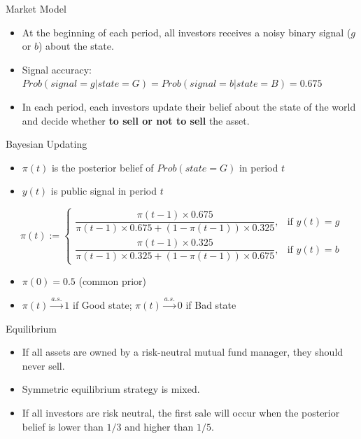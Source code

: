 \documentclass{beamer}
\begin{document}
\begin{frame}{Market Model}
\begin{itemize}

    \item At the beginning of each period, all investors receives a noisy binary signal ($g$ or $b$) about the state.
    \item Signal accuracy: \\$Prob( signal = g|state = G ) =  Prob( signal = b|state = B ) = 0.675$
    \item In each period, each investors update their belief about the state of the world and decide whether \textbf{to sell or not to sell} the asset.
\end{itemize}
\end{frame}


\begin{frame}{Bayesian Updating}
\begin{itemize}
    \item $\pi(t)$ is the posterior belief of $Prob(state = G)$ in period $t$  
    \item $y(t)$ is public signal in period $t$  
\end{itemize}

\begin{equation*}
    \pi(t) :=
    \begin{cases}
        \dfrac{\pi(t\!-\!1) \times 0.675}{\pi(t\!-\!1)\times 0.675 + (1\!-\!\pi(t\!-\!1))\times 0.325}, & \text{if } y(t) = g \\[12pt]
        \dfrac{\pi(t\!-\!1)\times 0.325}{\pi(t\!-\!1)\times 0.325 + (1\!-\!\pi(t\!-\!1))\times 0.675}, & \text{if } y(t) = b
    \end{cases}
\end{equation*}

\vspace{0.1in}

\begin{itemize}
    \item $\pi(0) = 0.5$ (common prior)
    \item $\pi(t) \overset{a.s.}{\to} 1$ if Good state; $\pi(t) \overset{a.s.}{\to} 0$ if Bad state
\end{itemize}
\end{frame}


\begin{frame}{Equilibrium}

\begin{itemize}
    \item If all assets are owned by a risk-neutral mutual fund manager, they should never sell. 
    \item Symmetric equilibrium strategy is mixed.
    \item If all investors are risk neutral, the first sale will occur when the posterior belief is lower than $1/3$ and higher than $1/5$.
    
\end{itemize}
\end{frame}
\end{document}

